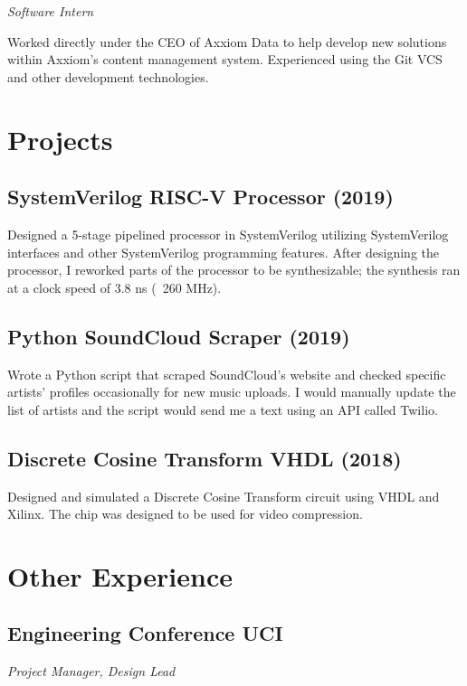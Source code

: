\documentclass{article}
\begin{document}
\noindent\textit{Software Intern}

Worked directly under the CEO of Axxiom Data to help develop new solutions within Axxiom's
content management system. Experienced using the Git VCS and other development technologies.

\section{Projects}

\subsection{SystemVerilog RISC-V Processor (2019)}

Designed a 5-stage pipelined processor in SystemVerilog utilizing SystemVerilog interfaces and other 
SystemVerilog programming features. After designing the processor, I reworked parts of the processor 
to be synthesizable; the synthesis ran at a clock speed of 3.8 ns (~260 MHz).

\subsection{Python SoundCloud Scraper (2019)}

Wrote a Python script that scraped SoundCloud's website and checked specific artists' profiles occasionally for new music uploads. 
I would manually update the list of artists and the script would send me a text using an API called Twilio.

\subsection{Discrete Cosine Transform VHDL (2018)}

Designed and simulated a Discrete Cosine Transform circuit using VHDL and Xilinx. The chip was designed to be 
used for video compression. 

\section{Other Experience}

\subsection{Engineering Conference UCI}

\noindent\textit{Project Manager, Design Lead}
\end{document}
